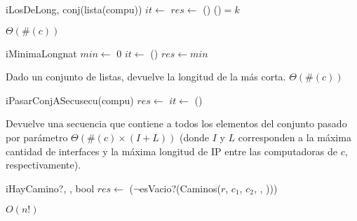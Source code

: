 \begin{Algoritmos}
  \begin{algoritmo}{iLosDeLong}{, }{conj(lista(compu))}
     $it \gets$ 
    $res \gets$ \vacio{} 
    \While(){}{
      \If(){$ = k$}{
         
      }
       
    }
  \end{algoritmo}
  {} %
  {} %
  {$\Theta(\#(c))$} %
  {} %

  \begin{algoritmo}{iMinimaLong}{}{nat}
     $min \gets$ 0 
     $it \gets$  
    \While(){}{
       
    }
    $res \gets min$
  \end{algoritmo}
  \datosAlgoritmo
  {Dado un conjunto de listas, devuelve la longitud de la m\'as corta.} %
  {} %
  {} %
  {$\Theta(\#(c))$} %
  {} %
    
	\begin{algoritmo}{iPasarConjASecu}{}{secu(compu)}{}
		$res \gets$ \vacia{} 
		 $it \gets$  
		\While(){}{
			  		
		}
	\end{algoritmo}    
  \datosAlgoritmo
  {Devuelve una secuencia que contiene a todos los elementos del conjunto pasado por par\'{a}metro} %
  {} %
  {} %
  {$\Theta(\#(c) \times (I + L))$ (donde $I$ y $L$ corresponden a la m\'axima cantidad de interfaces y la m\'axima longitud de IP entre las computadoras de $c$, respectivamente).} %
  {} %
     
  \begin{algoritmo}{iHayCamino?}{, , }{bool}{}
    $res \gets$ ($\neg$esVacio?(Caminos($r$, $c_{1}$, $c_{2}$, , ))) 
  \end{algoritmo}
  \datosAlgoritmo{} %
  {} %
  {} %
  {$O(n!)$} %
  {} %


\end{Algoritmos}
